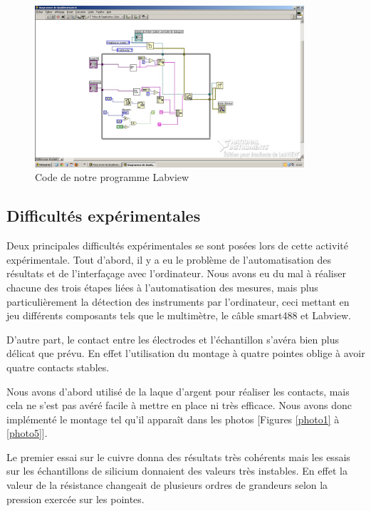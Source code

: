 \begin{figure}[!t]
  \begin{center}
		\includegraphics[height=6cm]{./images/labview.jpg}
		\caption{Code de notre programme Labview}
		\label{code_labview}
	\end{center}
\end{figure}

\newpage

\subsection{Difficultés expérimentales}
Deux principales difficultés expérimentales se sont posées lors de cette activité expérimentale.
Tout d'abord, il y a eu le problème de l'automatisation des résultats et de l'interfaçage avec l'ordinateur.
Nous avons eu du mal à réaliser chacune des trois étapes liées à l'automatisation des mesures, mais plus particulièrement 
la détection des instruments par l'ordinateur, ceci mettant en jeu différents composants tels que le 
multimètre, le câble smart488 et Labview.

\bigskip

D'autre part, le contact entre les électrodes et l'échantillon s'avéra bien plus délicat que prévu. 
En effet l'utilisation du montage à quatre pointes oblige à avoir quatre contacts stables.

Nous avons d'abord utilisé de la laque d'argent pour réaliser les contacts, mais cela ne s'est pas avéré facile à mettre en place ni très efficace.
Nous avons donc implémenté le montage tel qu'il apparaît dans les photos [Figures \ref{photo1} à \ref{photo5}].

Le premier essai sur le cuivre donna des résultats 
très cohérents mais les essais sur les échantillons de silicium donnaient des valeurs très instables. 
En effet la valeur de la résistance changeait de plusieurs ordres de grandeurs selon la pression exercée sur les 
pointes.

